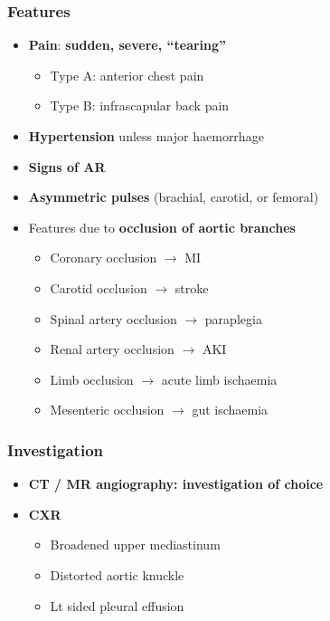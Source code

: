 \documentclass[
  12pt,
]{memoir}
\providecommand{\tightlist}{%
  \setlength{\itemsep}{0pt}\setlength{\parskip}{0pt}}
\begin{document}
\hypertarget{features-4}{%
\subsubsection{Features}\label{features-4}}

\begin{itemize}
\tightlist
\item
  \textbf{Pain}: \textbf{sudden, severe, ``tearing''}

  \begin{itemize}
  \tightlist
  \item
    Type A: anterior chest pain
  \item
    Type B: infrascapular back pain
  \end{itemize}
\item
  \textbf{Hypertension} unless major haemorrhage
\item
  \textbf{Signs of AR}
\item
  \textbf{Asymmetric pulses} (brachial, carotid, or femoral)
\item
  Features due to \textbf{occlusion of aortic branches}

  \begin{itemize}
  \tightlist
  \item
    Coronary occlusion \(\rightarrow\) MI
  \item
    Carotid occlusion \(\rightarrow\) stroke
  \item
    Spinal artery occlusion \(\rightarrow\) paraplegia
  \item
    Renal artery occlusion \(\rightarrow\) AKI
  \item
    Limb occlusion \(\rightarrow\) acute limb ischaemia
  \item
    Mesenteric occlusion \(\rightarrow\) gut ischaemia
  \end{itemize}
\end{itemize}

\hypertarget{investigation-5}{%
\subsubsection{Investigation}\label{investigation-5}}

\begin{itemize}
\tightlist
\item
  \textbf{CT / MR angiography: investigation of choice}
\item
  \textbf{CXR}

  \begin{itemize}
  \tightlist
  \item
    Broadened upper mediastinum
  \item
    Distorted aortic knuckle
  \item
    Lt sided pleural effusion
  \end{itemize}
\end{itemize}
\end{document}
